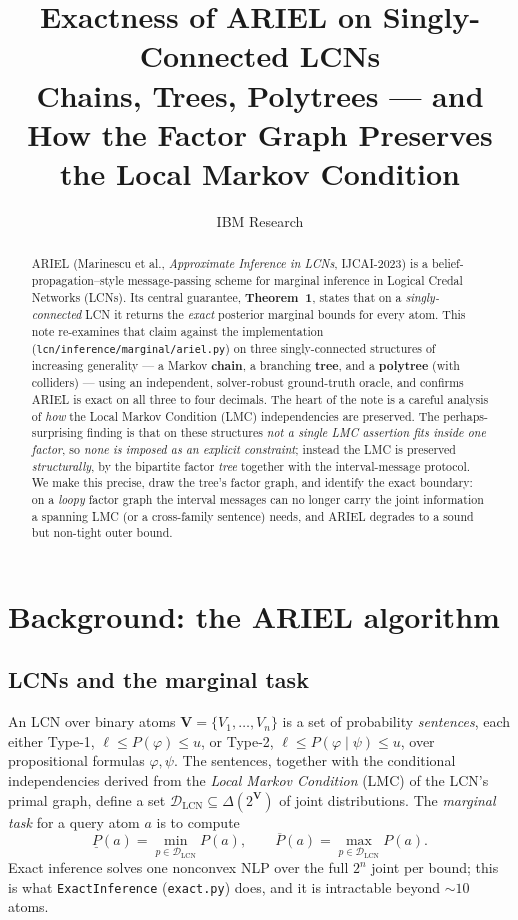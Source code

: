 \documentclass[11pt]{article}
\title{Exactness of ARIEL on Singly-Connected LCNs\\
\large Chains, Trees, Polytrees --- and How the Factor Graph Preserves the
Local Markov Condition}
\author{IBM Research}
\date{}
\newcommand{\lo}{\underline}
\newcommand{\hi}{\overline}
\begin{document}
\maketitle

\begin{abstract}
ARIEL (Marinescu et al., \emph{Approximate Inference in LCNs}, IJCAI-2023) is a
belief-propagation--style message-passing scheme for marginal inference in Logical Credal
Networks (LCNs). Its central guarantee, \textbf{Theorem~1}, states that on a
\emph{singly-connected} LCN it returns the \emph{exact} posterior marginal bounds for every atom.
This note re-examines that claim against the implementation
(\texttt{lcn/inference/marginal/ariel.py}) on three singly-connected structures of increasing
generality --- a Markov \textbf{chain}, a branching \textbf{tree}, and a \textbf{polytree} (with
colliders) --- using an independent, solver-robust ground-truth oracle, and confirms ARIEL is exact
on all three to four decimals. The heart of the note is a careful analysis of \emph{how} the
Local Markov Condition (LMC) independencies are preserved. The perhaps-surprising finding is that
on these structures \emph{not a single LMC assertion fits inside one factor}, so \emph{none is
imposed as an explicit constraint}; instead the LMC is preserved \emph{structurally}, by the
bipartite factor \emph{tree} together with the interval-message protocol. We make this precise,
draw the tree's factor graph, and identify the exact boundary: on a \emph{loopy} factor graph the
interval messages can no longer carry the joint information a spanning LMC (or a cross-family
sentence) needs, and ARIEL degrades to a sound but non-tight outer bound.
\end{abstract}

\tableofcontents

\section{Background: the ARIEL algorithm}\label{sec:bg}

\subsection{LCNs and the marginal task}
An LCN over binary atoms $\mathbf V=\{V_1,\dots,V_n\}$ is a set of probability \emph{sentences},
each either Type-1, $\ell\le P(\varphi)\le u$, or Type-2, $\ell\le P(\varphi\mid\psi)\le u$, over
propositional formulas $\varphi,\psi$. The sentences, together with the conditional
independencies derived from the \emph{Local Markov Condition} (LMC) of the LCN's primal graph,
define a set $\mathcal D_{\mathrm{LCN}}\subseteq\Delta(2^{\mathbf V})$ of joint distributions. The
\emph{marginal task} for a query atom $a$ is to compute
\[
  \lo P(a)=\min_{p\in\mathcal D_{\mathrm{LCN}}}P(a),\qquad
  \hi P(a)=\max_{p\in\mathcal D_{\mathrm{LCN}}}P(a).
\]
Exact inference solves one nonconvex NLP over the full $2^n$ joint per bound; this is what
\texttt{ExactInference} (\texttt{exact.py}) does, and it is intractable beyond $\sim\!10$ atoms.
\end{document}
